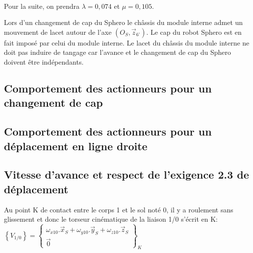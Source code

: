 


~\

Pour la suite, on prendra $\lambda=0,074$ et $\mu=0,105$.

Lors d’un changement de cap du Sphero le châssis du module interne admet un mouvement de lacet autour de l’axe $(O_S,\overrightarrow{z}_{6’})$. Le cap du robot Sphero est en fait imposé par celui du module interne. Le lacet du châssis du module interne ne doit pas induire de tangage car l’avance et le changement de cap du Sphero doivent être indépendants.
 
\subsection{Comportement des actionneurs pour un changement de cap}



\subsection{Comportement des actionneurs pour un déplacement en ligne droite}



\subsection{Vitesse d’avance et respect de l’exigence 2.3 de déplacement}

Au point K de contact entre le corps 1 et le sol noté 0, il y a roulement sans glissement et donc le torseur cinématique de la liaison 1/0 s’écrit en K:
$\left \{V_{1/ 0}\right \}=
\left \{\begin{matrix} \omega_{x10}.\vec{x}_S+\omega_{y10}.\vec{y}_S+\omega_{z10}.\vec{z}_S \\ 
 \vec{0}\end{matrix}\right \}_{K}$
 

